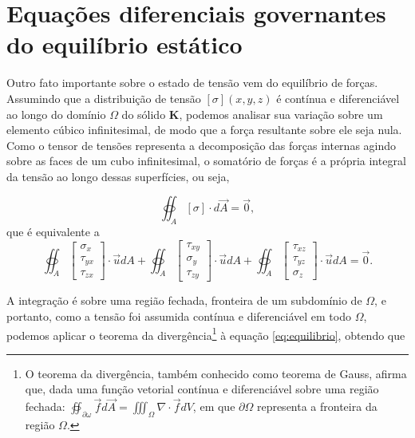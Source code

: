 \section{Equações diferenciais governantes do equilíbrio estático}

Outro fato importante sobre o estado de tensão vem do equilíbrio de forças. Assumindo que a distribuição de tensão $[\sigma](x,y,z)$ é contínua e diferenciável ao longo do domínio $\Omega$ do sólido $\bm{K}$, podemos analisar sua variação sobre um elemento cúbico infinitesimal, de modo que a força resultante sobre ele seja nula. Como o tensor de tensões representa a decomposição das forças internas agindo sobre as faces de um cubo infinitesimal, o somatório de forças é a própria integral da tensão ao longo dessas superfícies, ou seja,

\begin{equation}
    \oiint_A [\sigma] \cdot d\vec{A} = \vec{0},
    \label{eq:equilibrio}
\end{equation}
que é equivalente a 
\begin{equation}
    \oiint_A \begin{bmatrix}
        \sigma_x   \\
        \tau_{yx}  \\
        \tau_{zx} 
    \end{bmatrix} \cdot \vec{u} dA
    + 
    \oiint_A \begin{bmatrix}
        \tau_{xy}  \\
        \sigma_y   \\
        \tau_{zy}
    \end{bmatrix} \cdot \vec{u} dA
    +
    \oiint_A \begin{bmatrix}
        \tau_{xz}  \\
        \tau_{yz}  \\
        \sigma_z
    \end{bmatrix} \cdot \vec{u} dA
    = \vec{0}.
\end{equation}

A integração é sobre uma região fechada, fronteira de um subdomínio de $\Omega$, e portanto, como a tensão foi assumida contínua e diferenciável em todo $\Omega$, podemos aplicar o teorema da divergência\footnote{O teorema da divergência, também conhecido como teorema de Gauss, afirma que, dada uma função vetorial contínua e diferenciável sobre uma região fechada: $ \oiint_{\partial \omega} \vec{f} d\vec{A} = \iiint_{\Omega} \nabla \cdot \vec{f} dV$, em que $\partial \Omega$ representa a fronteira da região $\Omega$.} à equação \ref{eq:equilibrio}, obtendo que

